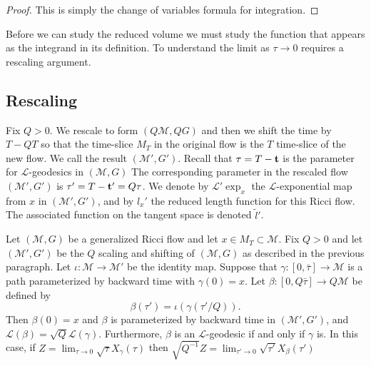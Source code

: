 \begin{proof}
\sketch
This is simply the change of variables formula for integration.
\end{proof}






Before we can study the reduced volume we must study the function
that appears as the integrand in its definition. To understand the
limit as $\tau\rightarrow 0$ requires a rescaling argument.


\subsection{Rescaling}


Fix $Q>0$. We rescale to form $(Q{\mathcal M},QG)$ and then we shift
the time by $T-QT$ so that the time-slice $M_T$ in the original flow
is the $T$ time-slice of the new flow. We call the result
$({\mathcal M}',G')$. Recall that $\tau=T-{\bf t}$ is the parameter
for ${\mathcal L}$-geodesics in $({\mathcal M},G)$ The corresponding
parameter in the rescaled flow $({\mathcal M}',G')$ is $\tau'=T-{\bf
t'}=Q\tau$. We denote by ${\mathcal L}'\exp_x$ the ${\mathcal
L}$-exponential map from $x$ in $({\mathcal M}',G')$, and by $l_x'$
the reduced length function for this Ricci flow. The associated
function on the tangent space is denoted $\tilde l'$.

\begin{lemma}\label{lem:l-length-rescaling}
\label{Lrescale}
Let $({\mathcal M},G)$ be a generalized Ricci flow and let $x\in
M_T\subset {\mathcal M}$. Fix $Q>0$ and let $({\mathcal M}',G')$ be
the $Q$ scaling and shifting of $({\mathcal M},G)$ as described in
the previous paragraph. Let $\iota\colon{\mathcal M}\to {\mathcal
M}'$ be the identity map. Suppose that $\gamma\colon [0,\bar\tau]\to
{\mathcal M}$ is a path parameterized by backward time with
$\gamma(0)=x$. Let $\beta\colon [0,Q\bar\tau]\to Q{\mathcal M}$ be
defined by
$$\beta(\tau')=\iota(\gamma(\tau'/Q)).$$
Then $\beta(0)=x$ and $\beta$ is parameterized by backward time in
$({\mathcal M}',G')$, and ${\mathcal L}(\beta)=\sqrt{Q}{\mathcal
L}(\gamma)$. Furthermore, $\beta$ is an ${\mathcal L}$-geodesic if
and only if $\gamma$ is. In this case, if $Z=\lim_{\tau\rightarrow 0}\sqrt{\tau}X_\gamma(\tau)$ then
$\sqrt{Q^{-1}}Z=\lim_{\tau'\rightarrow
0}\sqrt{\tau'}X_\beta(\tau')$
\end{lemma}

